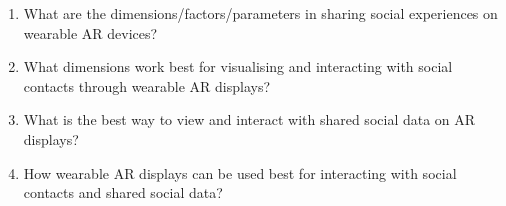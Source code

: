 \begin{enumerate}[label=RQ\arabic*]
    \item{\label{rq:continuum}What are the dimensions/factors/parameters in sharing social experiences on wearable AR devices?
    }
    \item{\label{rq:people}What dimensions work best for visualising and interacting with social contacts through wearable AR displays?
    }
    \item{\label{rq:data}What is the best way to view and interact with shared social data on AR displays?
    }
    \item{\label{rq:interaction}How wearable AR displays can be used best for interacting with social contacts and shared social data?
    }
\end{enumerate}

